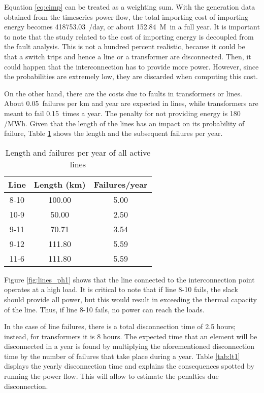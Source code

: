 Equation \ref{eq:cimp} can be treated as a weighting sum. With the generation data obtained from the timeseries power flow, the total importing cost of importing energy becomes 418753.03~\texteuro/day, or about 152.84~M\texteuro \ in a full year. It is important to note that the study related to the cost of importing energy is decoupled from the fault analysis. This is not a hundred percent realistic, because it could be that a switch trips and hence a line or a transformer are disconnected. Then, it could happen that the interconnection has to provide more power. However, since the probabilities are extremely low, they are discarded when computing this cost. 

On the other hand, there are the costs due to faults in transformers or lines. About 0.05~failures per km and year are expected in lines, while transformers are meant to fail 0.15~times a year. The penalty for not providing energy is 180 \texteuro/MWh. Given that the length of the lines has an impact on its probability of failure, Table \ref{tab:ll1} shows the length and the subsequent failures per year.

\begin{table}[!htb]\centering
  \begin{tabular}[]{ccc}
    \hline 
    \textbf{Line} & \textbf{Length (km)} & \textbf{Failures/year} \\
    \hline
    8-10 & 100.00 & 5.00 \\
    10-9 & 50.00 & 2.50 \\
    9-11 & 70.71 & 3.54 \\
    9-12 & 111.80 & 5.59 \\
    11-6 & 111.80 & 5.59 \\
    \hline
  \end{tabular}
  \caption{Length and failures per year of all active lines}
  \label{tab:ll1}
\end{table}
Figure \ref{fig:lines_ph1} shows that the line connected to the interconnection point operates at a high load. It is critical to note that if line 8-10 fails, the slack should provide all power, but this would result in exceeding the thermal capacity of the line. Thus, if line 8-10 fails, no power can reach the loads. 
 

In the case of line failures, there is a total disconnection time of 2.5 hours; instead, for transformers it is 8 hours. The expected time that an element will be disconnected in a year is found by multiplying the aforementioned disconnection time by the number of failures that take place during a year. Table \ref{tab:lt1} displays the yearly disconnection time and explains the consequences spotted by running the power flow. This will allow to estimate the penalties due disconnection. 

